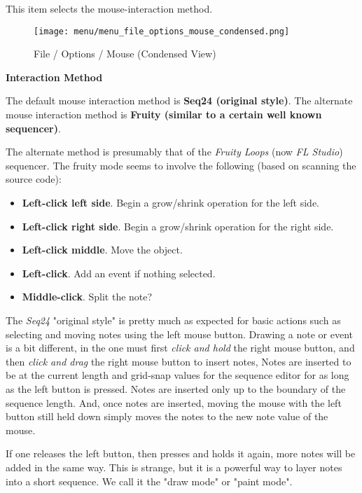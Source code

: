    This item selects the mouse-interaction method.

\begin{figure}[H]
   \centering 
   \texttt{[image: menu/menu\_file\_options\_mouse\_condensed.png]}
   \caption{File / Options / Mouse (Condensed View)}
   \label{fig:seq64_menu_file_options_mouse}
\end{figure}

   \textbf{Interaction Method}

   The default mouse interaction method is \textbf{Seq24 (original style)}.
   The alternate mouse interaction method is \textbf{Fruity (similar to a
   certain well known sequencer)}.

   The alternate method is presumably that of the \textsl{Fruity Loops}
   (now \textsl{FL Studio}) sequencer.  The fruity mode seems to involve the
   following (based on scanning the source code):

   \begin{itemize}
      \item \textbf{Left-click left side}.
         Begin a grow/shrink operation for the left side.
      \item \textbf{Left-click right side}.
         Begin a grow/shrink operation for the right side.
      \item \textbf{Left-click middle}.
         Move the object.
      \item \textbf{Left-click}.
         Add an event if nothing selected.
      \item \textbf{Middle-click}.
         Split the note?
   \end{itemize}

   The \textsl{Seq24} "original style" is pretty much as expected for basic
   actions such as selecting and moving notes using the left mouse button.
   Drawing a note or event is a bit different, in the one must first
   \textsl{click and hold} the right mouse button, and then
   \textsl{click and drag} the right mouse button to insert notes,
   Notes are inserted to be at the current length and grid-snap values for
   the sequence editor for as long as the left button is pressed.
   Notes are inserted only up to the boundary of the sequence length.
   And, once notes are inserted, moving the mouse with the left button still
   held down simply moves the notes to the new note value of the mouse.

   If one releases the left button, then presses and holds it again,
   more notes will be added in the same way.
   This is strange, but it is a powerful way to layer notes into a short
   sequence.
   We call it the   "draw mode" or
     "paint mode".

